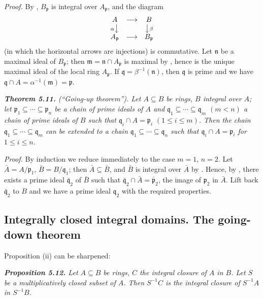 \noindent\emph{Proof.}  By , $B_\mathfrak p$ is integral over $A_\mathfrak p$, and the diagram
\[
\begin{array}{ccc}
A&\longrightarrow&B\\
{\scriptstyle\alpha}\big\downarrow&&\big\downarrow{\scriptstyle\beta}\\
A_\mathfrak p&\longrightarrow&B_\mathfrak p
\end{array}
\]
(in which the horizontal arrows are injections) is commutative.  Let $\mathfrak n$ be a maximal ideal of $B_\mathfrak p$; then $\mathfrak m=\mathfrak n\cap A_\mathfrak p$ is maximal by , hence is the unique
maximal ideal of the local ring $A_\mathfrak p$.  If $\mathfrak q=\beta^{-1}(\mathfrak n)$, then $\mathfrak q$ is prime and we have
$\mathfrak q\cap A=\alpha^{-1}(\mathfrak m)=\mathfrak p$.\proofbox

\medskip
\noindent\textit{\textbf{Theorem 5.11.} (``Going-up theorem''). Let $A\subseteq B$ be rings, $B$ integral
over $A$; let $\mathfrak p_1\subseteq\cdots\subseteq\mathfrak p_n$ be a chain of prime ideals of $A$ and $\mathfrak q_1\subseteq\cdots\subseteq\mathfrak q_m$
$(m<n)$ a chain of prime ideals of $B$ such that $\mathfrak q_i\cap A=\mathfrak p_i$ $(1\leq i\leq m)$.
Then the chain $\mathfrak q_1\subseteq\cdots\subseteq\mathfrak q_m$ can be extended to a chain $\mathfrak q_1\subseteq\cdots\subseteq\mathfrak q_n$ such
that $\mathfrak q_i\cap A=\mathfrak p_i$ for $1\leq i\leq n$.}

\noindent\emph{Proof.}  By induction we reduce immediately to the case $m=1$, $n=2$.  Let
$\bar A=A/\mathfrak p_1$, $\bar B=B/\mathfrak q_1$; then $\bar A\subseteq\bar B$, and $\bar B$ is integral over $\bar A$ by .  Hence, by
, there exists a prime ideal $\bar{\mathfrak q}_2$ of $\bar B$ such that $\bar{\mathfrak q}_2\cap\bar A=\bar{\mathfrak p}_2$, the image of $\mathfrak p_2$
in $\bar A$.  Lift back $\bar{\mathfrak q}_2$ to $B$ and we have a prime ideal $\mathfrak q_2$ with the required properties.\proofbox

\subsection{Integrally closed integral domains. The going-down theorem}

Proposition (ii) can be sharpened:

\medskip
\noindent\textit{\textbf{Proposition 5.12.} Let $A\subseteq B$ be rings, $C$ the integral closure of $A$ in $B$.  Let $S$
be a multiplicatively closed subset of $A$.  Then $S^{-1}C$ is the integral closure of
$S^{-1}A$ in $S^{-1}B$.}

